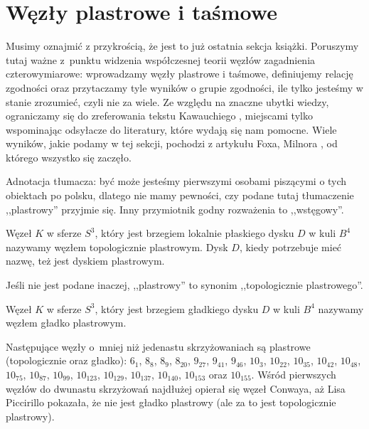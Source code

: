 
\section{Węzły plastrowe i taśmowe}
\label{sec:slice}
Musimy oznajmić z przykrością, że jest to już ostatnia sekcja książki.
Poruszymy tutaj ważne z~punktu widzenia współczesnej teorii węzłów zagadnienia czterowymiarowe: wprowadzamy węzły plastrowe i taśmowe, definiujemy relację zgodności oraz przytaczamy tyle wyników o grupie zgodności, ile tylko jesteśmy w stanie zrozumieć, czyli nie za wiele.
Ze względu na znaczne ubytki wiedzy, ograniczamy się do zreferowania tekstu Kawauchiego \cite[s. 154-169]{kawauchi1996}, miejscami tylko wspominając odsyłacze do literatury, które wydają się nam pomocne.
Wiele wyników, jakie podamy w tej sekcji, pochodzi z artykułu Foxa, Milnora \cite{fox1966}, od którego wszystko się zaczęło.
%
%

Adnotacja tłumacza: być może jesteśmy pierwszymi osobami piszącymi o tych obiektach po polsku, dlatego nie mamy pewności, czy podane tutaj tłumaczenie ,,plastrowy'' przyjmie się.
Inny przymiotnik godny rozważenia to ,,wstęgowy''.

\begin{definition}
%
    Węzeł $K$ w sferze $S^3$, który jest brzegiem lokalnie płaskiego dysku $D$ w kuli $B^4$ nazywamy węzłem topologicznie plastrowym. %
    Dysk $D$, kiedy potrzebuje mieć nazwę, też jest dyskiem plastrowym.
\end{definition}

Jeśli nie jest podane inaczej, ,,plastrowy'' to synonim ,,topologicznie plastrowego''.

\begin{definition}
    Węzeł $K$ w sferze $S^3$, który jest brzegiem gładkiego dysku $D$ w kuli $B^4$ nazywamy węzłem gładko plastrowym.
\end{definition}

Następujące węzły o~mniej niż jedenastu skrzyżowaniach są plastrowe (topologicznie oraz gładko): $6_1$, $8_{8}$, $8_{9}$, $8_{20}$, $9_{27}$, $9_{41}$, $9_{46}$, $10_{3}$, $10_{22}$, $10_{35}$, $10_{42}$, $10_{48}$, $10_{75}$, $10_{87}$, $10_{99}$, $10_{123}$, $10_{129}$, $10_{137}$, $10_{140}$, $10_{153}$ oraz $10_{155}$.
Wśród pierwszych węzłów do dwunastu skrzyżowań najdłużej opierał się węzeł Conwaya, aż Lisa Piccirillo \cite{piccirillo2020} pokazała, że nie jest gładko plastrowy (ale za to jest topologicznie plastrowy).
%

